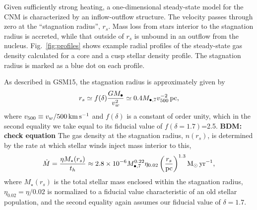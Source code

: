 \documentclass[usenatbib,fleqn]{mnras}
\newcommand{\Mbh}[1][]{M_{\bullet#1}}
\newcommand{\Msun}{{\rm M_\odot}}
\newcommand{\rs}{r_s}
\begin{document}
Given sufficiently strong heating, a one-dimensional steady-state
model for the CNM is characterized by an inflow-outflow structure.
The velocity passes through zero at the ``stagnation radius'', $\rs$.
Mass loss from stars interior to the stagnation radius is accreted,
while that outside of $\rs$ is unbound in an outflow from the nucleus.
Fig.~\ref{fig:profiles} shows example radial profiles of the
steady-state gas density calculated for a core and a cusp stellar
density profile. The stagnation radius is marked as a blue dot on each
profile.

As described in GSM15, the stagnation radius is approximately given by
\begin{align}
r_s \simeq f(\delta) \frac{G M_{\bullet}}{v_w^2}
  \simeq 0.4 \Mbh[,7] v_{500}^{-2} \,{\rm pc},
\label{eq:rs}
\end{align}
%
where $v_{500}\equiv v_w/500 \,{\rm km\, s^{-1}}$ and $f(\delta)$ is a
constant of order unity, which in the second equality we take equal to its fiducial value of $f(\delta = 1.7)$=2.5. {\bf BDM: check equation}  The gas density at the stagnation radius, $n(\rs)$, is
determined by the rate at which stellar winds inject mass interior to
this,
\begin{equation}
  \dot{M}=\frac{\eta M_{\rm \star}(\rs)}{t_h} \approx  2.8 \times 10^{-6} \Mbh[,7]^{0.22} \eta_{0.02} \left(\frac{r_s}{\rm
      pc}\right)^{1.3} \Msun \, {\rm yr}^{-1},
\label{eq:dotM}
\end{equation}
%
where $M_{\star}(\rs)$ is the total stellar mass enclosed within the
stagnation radius, $\eta_{0.02}=\eta/0.02$ is normalized to
a fiducial value characteristic of an old stellar population, and the second equality again assumes our fiducial
value of $\delta=1.7$.
\end{document}
